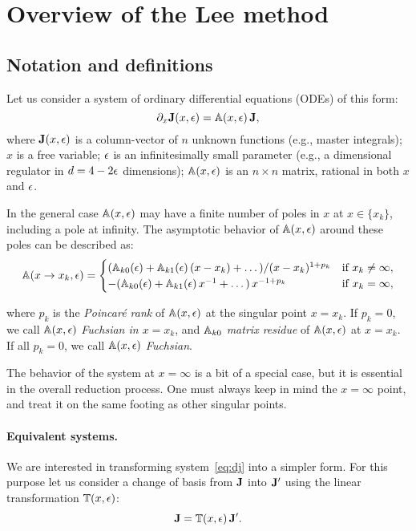 \documentclass[12pt,a4paper]{article}
\begin{document}
\section{Overview of the Lee method}
\label{sec:2}

\subsection{Notation and definitions}

Let us consider a system of ordinary differential equations (ODEs) of this form:
\begin{equation}
\label{eq:dj}
    \partial_x \mathbf{J}(x,\epsilon) = \mathbb{A}(x,\epsilon)\,\mathbf{J},
\end{equation}
where $\mathbf{J}(x,\epsilon)$ is a column-vector of $n$ unknown functions (e.g., master integrals);
$x$ is a free variable;
$\epsilon$ is an infinitesimally small parameter (e.g., a dimensional regulator in $d=4-2\epsilon$ dimensions);
$\mathbb{A}(x,\epsilon)$ is an $n \times n$ matrix, rational in both $x$ and $\epsilon$.

In the general case $\mathbb{A}(x,\epsilon)$ may have a finite number of poles in $x$ at $x\in\{x_k\}$, including a pole at infinity.
The asymptotic behavior of $\mathbb{A}(x,\epsilon)$ around these poles can be described as:
\begin{equation}
\label{eq:axeps}
    \mathbb{A}(x \to x_k,\epsilon) =
    \begin{cases}
        (\mathbb{A}_{k0}(\epsilon) + \mathbb{A}_{k1}(\epsilon)\,(x - x_k) + \dots)/(x - x_k)^{1+p_k} & \text{if $x_k\neq\infty$}, \\
        -(\mathbb{A}_{k0}(\epsilon) + \mathbb{A}_{k1}(\epsilon)\,x^{-1} + \dots)\,x^{-1 + p_k} & \text{if $x_k=\infty$},
    \end{cases}
\end{equation}

where $p_k$ is the \textit{Poincar\'e rank} of $\mathbb{A}(x,\epsilon)$ at the singular point $x=x_k$.
If $p_k=0$, we call $\mathbb{A}(x,\epsilon)$ \textit{Fuchsian in $x=x_k$}, and $\mathbb{A}_{k0}$ \textit{matrix residue} of $\mathbb{A}(x,\epsilon)$ at $x=x_k$.
If all $p_k=0$, we call $\mathbb{A}(x,\epsilon)$ \textit{Fuchsian}.

The behavior of the system at $x=\infty$ is a bit of a special case, but it is essential in the overall reduction process.
One must always keep in mind the $x=\infty$ point, and treat it on the same footing as other singular points.

\paragraph{Equivalent systems.}
We are interested in transforming system~\eqref{eq:dj} into a simpler form.
For this purpose let us consider a change of basis from $\mathbf{J}$ into $\mathbf{J}'$ using the linear transformation $\mathbb{T}(x,\epsilon)$:
\begin{equation}
  \mathbf{J} = \mathbb{T}(x,\epsilon)\, \mathbf{J}'.
\end{equation}
\end{document}

